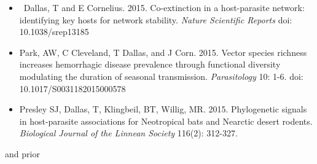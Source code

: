 \documentclass[]{CV}
\begin{document}
{}

\begin{itemize}

\item \OA \ {\mefont Dallas, T} and E Cornelius. 2015. Co-extinction in a host-parasite network: identifying key hosts for network stability. \textit{Nature Scientific Reports} doi: 10.1038/srep13185

\item Park, AW, C Cleveland, {\mefont T Dallas}, and J Corn. 2015. Vector species richness increases hemorrhagic disease prevalence through functional diversity modulating the duration of seasonal transmission. \textit{Parasitology} 10: 1-6. doi: 10.1017/S0031182015000578

\item Presley SJ, {\mefont Dallas, T}, Klingbeil, BT, Willig, MR. 2015. Phylogenetic signals in host-parasite associations for Neotropical bats and Nearctic desert rodents. \textit{Biological Journal of the Linnean Society} 116(2): 312-327. \href{http://datadryad.org/resource/doi:10.5061/dryad.bp62d}{ \OD}

\end{itemize}



{ and prior}
\end{document}

